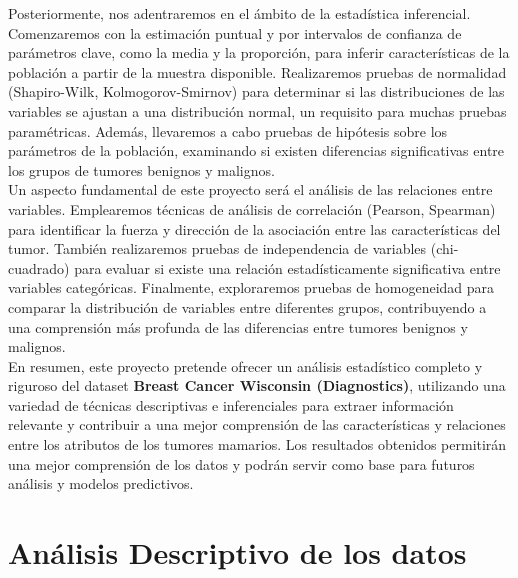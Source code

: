\documentclass[a4paper, 12pt]{article}
\begin{document}
Posteriormente, nos adentraremos en el ámbito de la estadística inferencial. Comenzaremos con la estimación puntual y por intervalos de confianza de parámetros clave, como la media y la proporción, para inferir características de la población a partir de la muestra disponible. Realizaremos pruebas de normalidad (Shapiro-Wilk, Kolmogorov-Smirnov) para determinar si las distribuciones de las variables se ajustan a una distribución normal, un requisito para muchas pruebas paramétricas. Además, llevaremos a cabo pruebas de hipótesis sobre los parámetros de la población, examinando si existen diferencias significativas entre los grupos de tumores benignos y malignos.\\

Un aspecto fundamental de este proyecto será el análisis de las relaciones entre variables. Emplearemos técnicas de análisis de correlación (Pearson, Spearman) para identificar la fuerza y dirección de la asociación entre las características del tumor. También realizaremos pruebas de independencia de variables (chi-cuadrado) para evaluar si existe una relación estadísticamente significativa entre variables categóricas. Finalmente, exploraremos pruebas de homogeneidad para comparar la distribución de variables entre diferentes grupos, contribuyendo a una comprensión más profunda de las diferencias entre tumores benignos y malignos.\\

En resumen, este proyecto pretende ofrecer un análisis estadístico completo y riguroso del dataset \textbf{Breast Cancer Wisconsin (Diagnostics)}, utilizando una variedad de técnicas descriptivas e inferenciales para extraer información relevante y contribuir a una mejor comprensión de las características y relaciones entre los atributos de los tumores mamarios. Los resultados obtenidos permitirán una mejor comprensión de los datos y podrán servir como base para futuros análisis y modelos predictivos.\\

\newpage

\section{Análisis Descriptivo de los datos}
\end{document}
